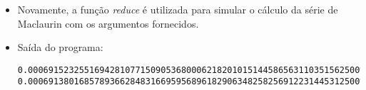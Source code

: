 \documentclass{article}
\newenvironment{arabenum}{
    \begin{enumerate}[label=\textbf{\arabic*})]
}{
    \end{enumerate}
}
\newenvironment{discusscode}[1]{
    
    \vspace{-2mm}
    \begin{itemize}
}{
    \end{itemize}
}
\begin{document}
\begin{arabenum}
\begin{discusscode}{maclaurin.py}
\item Novamente, a função \emph{reduce} é utilizada para simular o cálculo da
série de Maclaurin com os argumentos fornecidos.

\item Saída do programa:
\begin{verbatim}
0.00069152325516942810771509053680006218201015144586563110351562500%
0.00069138016857893662848316695956896182906348258256912231445312500%
\end{verbatim}

\end{discusscode}

\end{arabenum}
\end{document}
